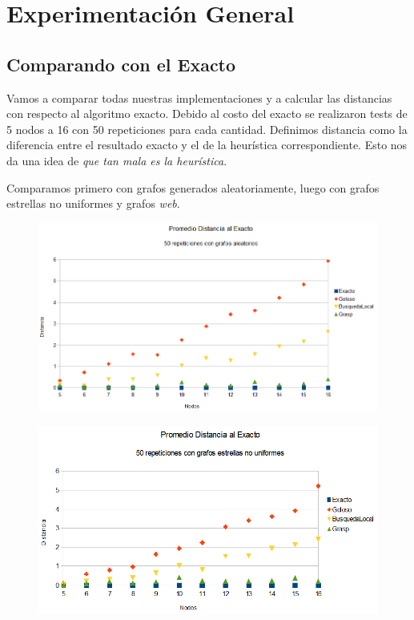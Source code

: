 \section{Experimentación General}


\subsection{Comparando con el Exacto}

\quad Vamos a comparar todas nuestras implementaciones y a calcular las distancias con respecto al algoritmo exacto. Debido al costo del exacto se realizaron tests de 5 nodos a 16 con 50 repeticiones para cada cantidad. Definimos distancia como la diferencia entre el resultado exacto y el de la heurística correspondiente. Esto nos da una idea de \textit{que tan mala es la heurística}.


\quad Comparamos primero con grafos generados aleatoriamente, luego con grafos estrellas no uniformes y grafos \textit{web}.


\begin{figure}[H]
	\centering
	\includegraphics[scale=0.6]{distancia-Azar.png}
\end{figure}

\begin{figure}[H]
	\centering
	\includegraphics[scale=0.6]{distancia-Star.png}
\end{figure}

